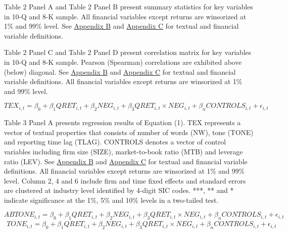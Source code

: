 
\newpage


Table 2 Panel A and Table 2 Panel B present summary statistics for key variables in 10-Q and 8-K sample. All financial variables except returns are winsorized at 1\% and 99\% level. See \hyperref[appb]{Appendix B} and \hyperref[appc]{Appendix C} for textual and financial variable definitions.

\newpage
\begin{landscape}


Table 2 Panel C and Table 2 Panel D present correlation matrix for key variables in 10-Q and 8-K sample. Pearson (Spearman) correlations are exhibited above (below) diagonal. See \hyperref[appb]{Appendix B} and \hyperref[appc]{Appendix C} for textual and financial variable definitions. All financial variables except returns are winsorized at 1\% and 99\% level. 
\end{landscape}

\newpage

\setcounter{equation}{0}
\begin{equation}
TEX_{i,t}=\beta_0+\beta_1QRET_{i,t}+\beta_2NEG_{i,t}+\beta_3QRET_{i,t}\times NEG_{i,t}+\beta_nCONTROLS_{i,t}+\epsilon_{i,t}
\end{equation}

Table 3 Panel A presents regression results of Equation (1). TEX represents a vector of textual properties that consists of number of words (NW), tone (TONE) and reporting time lag (TLAG). CONTROLS denotes a vector of control variables including firm size (SIZE), market-to-book ratio (MTB) and leverage ratio (LEV). See \hyperref[appb]{Appendix B} and \hyperref[appc]{Appendix C} for textual and financial variable definitions. All financial variables except returns are winsorized at 1\% and 99\% level. Column 2, 4 and 6 include firm and time fixed effects and standard errors are clustered at industry level identified by 4-digit SIC codes. ***, ** and * indicate significance at the 1\%, 5\% and 10\% levels in a two-tailed test.

\newpage

\setcounter{equation}{3}
\begin{equation}
ABTONE_{i,t}=\beta_0+\beta_1QRET_{i,t}+\beta_2NEG_{i,t}+\beta_3QRET_{i,t}\times NEG_{i,t}+\beta_nCONTROLS_{i,t}+\epsilon_{i,t}
\end{equation}
\begin{equation}
\begin{split}
TONE_{i,t}=\beta_0+\beta_1QRET_{i,t}+\beta_2NEG_{i,t}+\beta_3QRET_{i,t}\times NEG_{i,t}+\beta_nCONTROLS_{i,t}+\epsilon_{i,t}
\end{split}
\end{equation}

